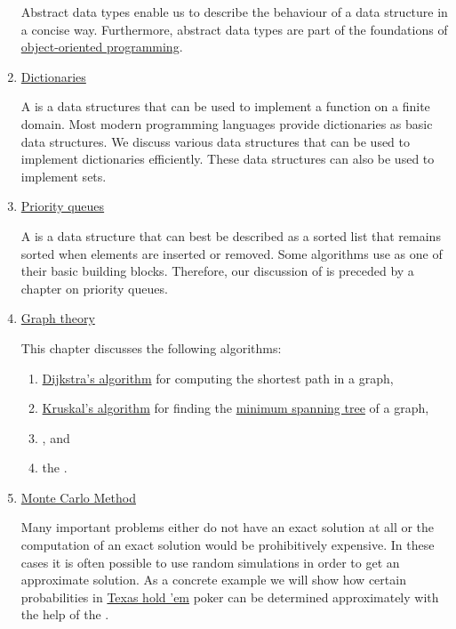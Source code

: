 \begin{enumerate}
      Abstract data types enable us to describe the behaviour of a data structure in a concise way.
      Furthermore, abstract data types are part of the foundations of 
      \href{https://en.wikipedia.org/wiki/Object-oriented_programming}{object-oriented programming}. 
%  

\item \href{http://en.wikipedia.org/wiki/Map_(computer_science)}{Dictionaries}
  
      A  is a data structures that can be used to implement a function on a finite domain.
      Most modern programming languages provide dictionaries as basic data structures.  We discuss various data
      structures that can be used to implement dictionaries efficiently.   
      These data structures can also be used to implement sets.
\item \href{http://en.wikipedia.org/wiki/Priority_queue}{Priority queues}

      A  is a data structure that can best be described as a sorted list that remains
      sorted when elements are inserted or removed.
      Some  algorithms use  as one of their basic building blocks.
      Therefore, our discussion of  is preceded by a chapter on priority queues.
\item \href{http://en.wikipedia.org/wiki/Graph_theory}{Graph theory}
  
      This chapter discusses the following algorithms:
      \begin{enumerate}
      \item \href{http://en.wikipedia.org/wiki/Dijkstra%27s_algorithm}{Dijkstra's algorithm}
            for computing the shortest path in a graph,
      \item \href{https://en.wikipedia.org/wiki/Kruskal%27s_algorithm}{Kruskal's algorithm} for finding the
            \href{https://en.wikipedia.org/wiki/Minimum_spanning_tree}{minimum spanning tree} of a graph,
      \item {}, and 
      \item the .
      \end{enumerate}
\item \href{http://en.wikipedia.org/wiki/Monte_Carlo_method}{Monte Carlo Method} 
 
      Many important problems either do not have an exact solution at all or the computation of an
      exact solution would be prohibitively expensive.  In these cases it is often possible to use 
      random simulations in order to get an approximate solution.  As a concrete example we will show
      how certain probabilities in \href{http://en.wikipedia.org/wiki/Texas_hold_%27em}{Texas hold 'em} 
      poker can be determined approximately with the help of the .
\end{enumerate}
